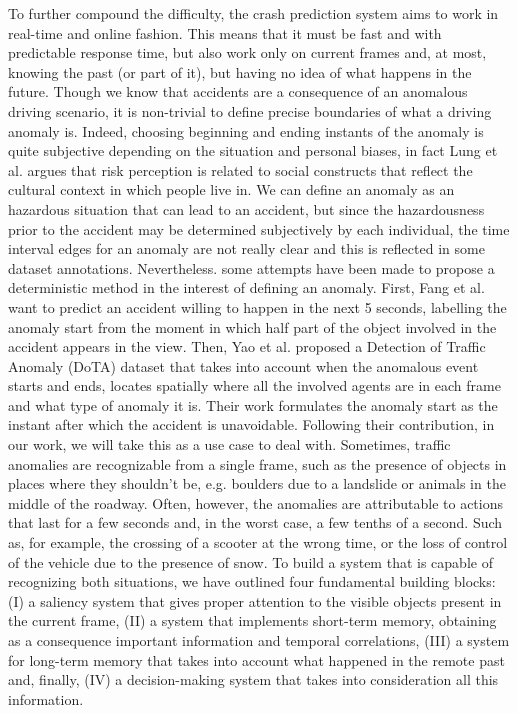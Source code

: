 To further compound the difficulty, the crash prediction system aims to work in real-time and online fashion.
This means that it must be fast and with predictable response time, but also work only on current frames and, at most, knowing the past (or part of it), but having no idea of what happens in the future.
Though we know that accidents are a consequence of an anomalous driving scenario, it is non-trivial to define precise boundaries of what a driving anomaly is.
Indeed, choosing beginning and ending instants of the anomaly is quite subjective depending on the situation and personal biases, in fact Lung et al. \cite{lund2009riskperception} argues that risk perception is related to social constructs that reflect the cultural context in which people live in.
We can define an anomaly as an hazardous situation that can lead to an accident, but since the hazardousness prior to the accident may be determined subjectively by each individual, the time interval edges for an anomaly are not really clear and this is reflected in some dataset annotations.
Nevertheless. some attempts have been made to propose a deterministic method in the interest of defining an anomaly.
First, Fang et al. \cite{fang2019dada} want to predict an accident willing to happen in the next 5 seconds, labelling the anomaly start from the moment in which half part of the object involved in the accident appears in the view.
Then, Yao et al. \cite{yao2020when} proposed a Detection of Traffic Anomaly (DoTA) dataset that takes into account when the anomalous event starts and ends, locates spatially where all the involved agents are in each frame and what type of anomaly it is.
Their work formulates the anomaly start as the instant after which the accident is unavoidable.
Following their contribution, in our work, we will take this as a use case to deal with.
Sometimes, traffic anomalies are recognizable from a single frame, such as the presence of objects in places where they shouldn't be, e.g. boulders due to a landslide or animals in the middle of the roadway.
Often, however, the anomalies are attributable to actions that last for a few seconds and, in the worst case, a few tenths of a second.
Such as, for example, the crossing of a scooter at the wrong time, or the loss of control of the vehicle due to the presence of snow.
To build a system that is capable of recognizing both situations, we have outlined four fundamental building blocks: (I) a saliency system that gives proper attention to the visible objects present in the current frame, (II) a system that implements short-term memory, obtaining as a consequence important information and temporal correlations, (III) a system for long-term memory that takes into account what happened in the remote past and, finally, (IV) a decision-making system that takes into consideration all this information.


